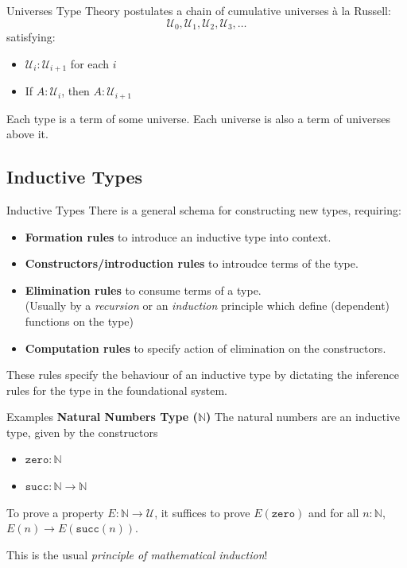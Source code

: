 \documentclass[10pt, aspectratio=43]{beamer}
\newcommand{\U}{\mathcal{U}}
\newcommand{\0}{\mathbf{0}}
\newcommand{\1}{\mathbf{1}}
\newcommand{\2}{\mathbf{2}}
\newcommand{\N}{\mathbb{N}}
\begin{document}
\begin{frame}{Universes}
  Type Theory postulates a chain of cumulative universes à la Russell:
  \[
    \U_0, \U_1, \U_2, \U_3, \ldots
  \]
  satisfying:
  \begin{itemize}
    \item $\U_i : \U_{i+1}$ for each $i$
    \item If $A : \U_i$, then $A : \U_{i+1}$
  \end{itemize}
  Each type is a term of some universe.
  Each universe is also a term of universes above it.
\end{frame}

\subsection{Inductive Types}

\begin{frame}{Inductive Types}
  There is a general schema for constructing new types, requiring:
  \begin{itemize}
    \item \textbf{Formation rules} to introduce an inductive type into context. 
    \item \textbf{Constructors/introduction rules} to introudce terms of the type.

    \item \textbf{Elimination rules} to consume terms of a type. \\
      (Usually by a \emph{recursion} or an \emph{induction} principle which define (dependent) functions on the type)

    \item \textbf{Computation rules} to specify action of elimination on the constructors.

  \end{itemize}
  These rules specify the behaviour of an inductive type by dictating the inference rules for the type 
  in the foundational system.
\end{frame}

\begin{frame}{Examples}
  \textbf{Natural Numbers Type ($\N$)}
  The natural numbers are an inductive type, given by the constructors 
  \begin{itemize}
    \item $\mathtt{zero} : \N$ 
    \item $\mathtt{succ} : \N \to \N$
  \end{itemize}
  To prove a property $E : \N \to \U$, it suffices to prove $E(\mathtt{zero})$ and for all $n : \N$, $E(n) \to E(\mathtt{succ}(n))$.

This is the usual \emph{principle of mathematical induction}!
\end{frame}
\end{document}
